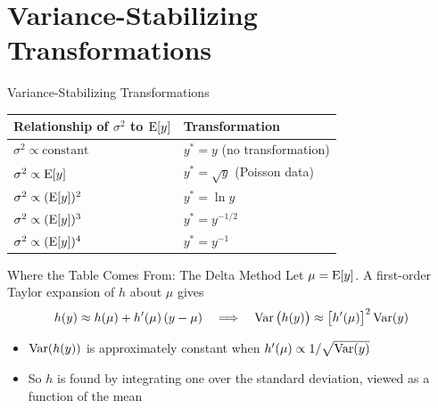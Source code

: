 \section{Variance-Stabilizing Transformations}


\begin{frame}{Variance-Stabilizing Transformations}
\begin{center}
{\renewcommand{\arraystretch}{1.4}
\small
\begin{tabular}{ll}
\toprule
Relationship of $\sigma^2$ to $\operatorname{E}[y]$ & Transformation \\
\midrule
$\sigma^2 \propto \text{constant}$ & $y^* = y$ (no transformation) \\
$\sigma^2 \propto \operatorname{E}[y]$ & $y^* = \sqrt{y}$ (Poisson data) \\
$\sigma^2 \propto (\operatorname{E}[y])^2$ & $y^* = \ln y$ \\
$\sigma^2 \propto (\operatorname{E}[y])^3$ & $y^* = y^{-1/2}$ \\
$\sigma^2 \propto (\operatorname{E}[y])^4$ & $y^* = y^{-1}$ \\
\bottomrule
\end{tabular}}
\end{center}
\end{frame}


\begin{frame}{Where the Table Comes From: The Delta Method}
Let $\mu = \operatorname{E}[y]$. A first-order Taylor expansion of $h$ about $\mu$ gives
\begin{align*}
    h(y) \approx h(\mu) + h'(\mu)\,(y - \mu)
    \quad\Longrightarrow\quad
    \operatorname{Var}\big(h(y)\big) \approx \big[h'(\mu)\big]^2 \operatorname{Var}(y)
\end{align*}
\begin{itemize}
    \item $\operatorname{Var}(h(y))$ is approximately constant when $h'(\mu) \propto 1/\sqrt{\operatorname{Var}(y)}$
    \item So $h$ is found by integrating one over the standard deviation, viewed as a function of the mean
\end{itemize}
\end{frame}


